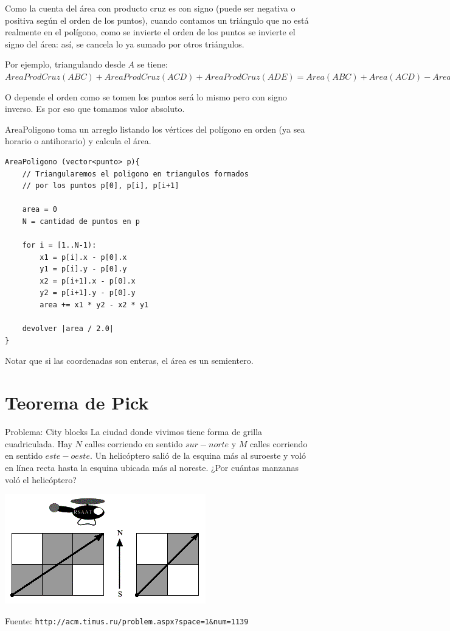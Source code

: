 \documentclass[compress]{beamer}
\begin{document}
\begin{frame}
Como la cuenta del área con producto cruz es con signo (puede ser negativa
o positiva según el orden de los puntos), cuando contamos un triángulo que
no está realmente en el polígono, como se invierte el orden de los puntos
se invierte el signo del área: así, se cancela lo ya sumado por otros triángulos.
\bigskip

Por ejemplo, triangulando desde $A$ se tiene:
{\small
$AreaProdCruz(ABC) + AreaProdCruz(ACD) + AreaProdCruz(ADE) = Area(ABC) + Area(ACD) - Area(ADE)$
}

\bigskip
O depende el orden como se tomen los puntos será lo mismo pero con signo inverso. Es por eso
que tomamos valor absoluto.
\end{frame}

\begin{frame}[fragile]
\footnotesize
AreaPoligono toma un arreglo listando los vértices del polígono en orden
(ya sea horario o antihorario) y calcula el área.

\begin{verbatim}
AreaPoligono (vector<punto> p){
    // Triangularemos el poligono en triangulos formados 
    // por los puntos p[0], p[i], p[i+1]
    
    area = 0
    N = cantidad de puntos en p

    for i = [1..N-1):
        x1 = p[i].x - p[0].x
        y1 = p[i].y - p[0].y
        x2 = p[i+1].x - p[0].x
        y2 = p[i+1].y - p[0].y
        area += x1 * y2 - x2 * y1
    
    devolver |area / 2.0|
}
\end{verbatim}

Notar que si las coordenadas son enteras, el área es un semientero.
\end{frame}

\section{Teorema de Pick}
\begin{frame}{Problema: City blocks}
La ciudad donde vivimos tiene forma de grilla cuadriculada. Hay $N$ calles
corriendo en sentido $sur-norte$ y $M$ calles corriendo en sentido $este-oeste$.
Un helicóptero salió de la esquina más al suroeste y voló en línea recta
hasta la esquina ubicada más al noreste. ¿Por cuántas manzanas voló el
helicóptero?

\begin{center}
\includegraphics[scale=0.6]{images/city_blocks.png}
\end{center}

{\scriptsize Fuente: \texttt{http://acm.timus.ru/problem.aspx?space=1\&num=1139}}
\end{frame}
\end{document}

